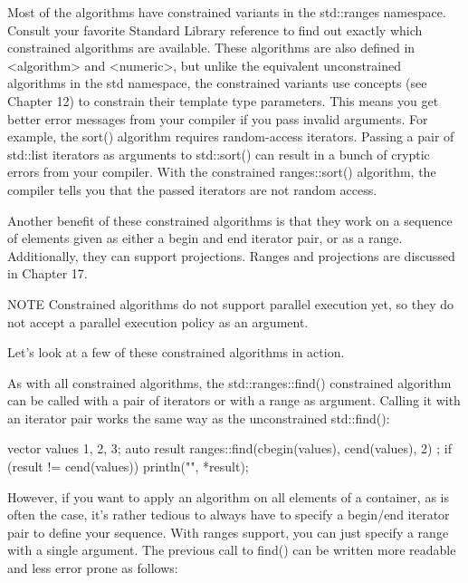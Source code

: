 
Most of the algorithms have constrained variants in the std::ranges namespace. Consult your favorite Standard Library reference to find out exactly which constrained algorithms are available.
These algorithms are also defined in <algorithm> and <numeric>, but unlike the equivalent unconstrained algorithms in the std namespace, the constrained variants use concepts (see Chapter 12) to constrain their template type parameters. This means you get better error messages from your compiler if you pass invalid arguments. For example, the sort() algorithm requires random-access iterators. Passing a pair of std::list iterators as arguments to std::sort() can result in a bunch of cryptic errors from your compiler. With the constrained ranges::sort() algorithm, the compiler tells you that the passed iterators are not random access.

Another benefit of these constrained algorithms is that they work on a sequence of elements given as either a begin and end iterator pair, or as a range. Additionally, they can support projections. Ranges and projections are discussed in Chapter 17.

\begin{myNotic}{NOTE}
Constrained algorithms do not support parallel execution yet, so they do not accept a parallel execution policy as an argument.
\end{myNotic}

Let’s look at a few of these constrained algorithms in action.


As with all constrained algorithms, the std::ranges::find() constrained algorithm can be called with a pair of iterators or with a range as argument. Calling it with an iterator pair works the same way as the unconstrained std::find():

\begin{cpp}
vector values {1, 2, 3};
auto result { ranges::find(cbegin(values), cend(values), 2) };
if (result != cend(values)) { println("{}", *result); }
\end{cpp}

However, if you want to apply an algorithm on all elements of a container, as is often the case, it’s rather tedious to always have to specify a begin/end iterator pair to define your sequence. With ranges support, you can just specify a range with a single argument. The previous call to find() can be written more readable and less error prone as follows:

